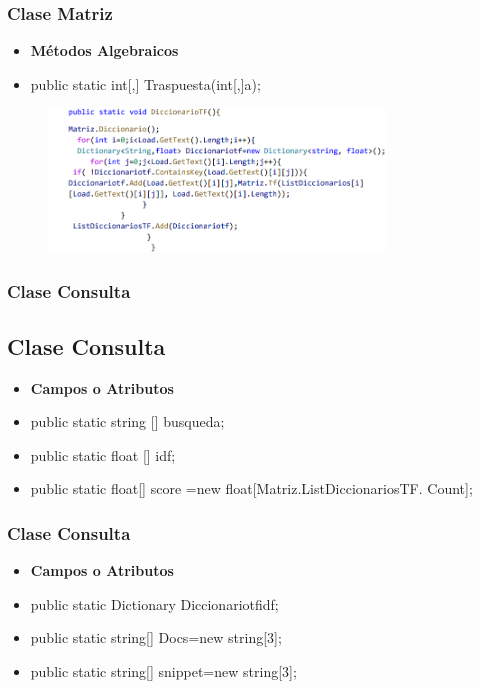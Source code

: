 \documentclass[17pt]{beamer}
\begin{document}
    \begin{frame}
        \frametitle{Clase Matriz}
        \begin{itemize}
            \item[] \textbf{Métodos Algebraicos}
            \item public static int[,] Traspuesta(int[,]a);
        \end{itemize}
        \begin{figure}
            \includegraphics[width=9cm]{code 2.png}
        \end{figure}
    \end{frame}
    \begin{frame}
        \frametitle{Clase Consulta}
        \subsection*{Clase Consulta}
        \begin{itemize}
            \item[] \textbf{Campos o Atributos}
            \item public static string [] busqueda;
            \item public static float [] idf;
            \item public static float[] score =new float[Matriz.ListDiccionariosTF.
            Count];
         \end{itemize}
    \end{frame}
    \begin{frame}
        \frametitle{Clase Consulta}
        \begin{itemize}
            \item[] \textbf{Campos o Atributos}
            \item public static Dictionary Diccionariotfidf;
            \item public static string[] Docs=new string[3];
            \item  public static string[] snippet=new string[3];
         \end{itemize}
         \end{frame}
\end{document}
